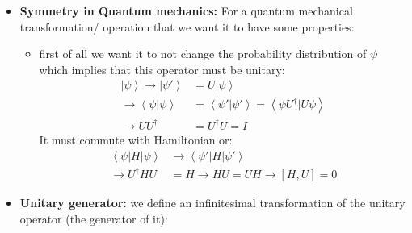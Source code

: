 \documentclass[10pt,a4paper]{article}
\newcommand{\braket}[2]{\left\langle #1 \vert #2 \right\rangle}
\newcommand{\ket}[1]{\left\vert #1 \right\rangle}
\begin{document}
\begin{itemize}
\begin{itemize}
\begin{equation}
\begin{matrix}
                              OO^T =O^TO = I
                         \end{matrix}\right.
                    \end{equation} 
                    \item $SO(n)$ is the special orthogonal group, these not only have the properties of orthogonal groups but also have the determinant of $1$.
                    \item $U(n)$ is the unitary group. 
                    \begin{equation} 
                         u\in U(n) \Rightarrow \left\{ \begin{matrix} n\times n \\
                              uu^\dagger =u^\dagger u = I
                         \end{matrix}\right.
                    \end{equation} 
               \end{itemize}
               \item \textbf{Symmetry in Quantum mechanics:} For a quantum mechanical transformation/ operation that we want it to have some properties:
               \begin{itemize}
                    \item first of all we want it to not change the probability distribution of $\psi$ which implies that this operator must be unitary:
                    \begin{align*}
                         \ket{\psi} \rightarrow \ket{\psi'} &= U\ket{\psi}\\
                         \rightarrow\braket{\psi}{\psi} &= \braket{\psi'}{\psi'} =\braket{\psi U^\dagger}{U\psi}\\
                         \rightarrow UU^\dagger &= U^\dagger U = I
                    \end{align*}
                    It must commute with Hamiltonian or:
                    \begin{align*}
                         \braket{\psi}{H\vert\psi}&\rightarrow\braket{\psi'\vert H}{\psi'}\\
                         \rightarrow U^\dagger HU &= H\rightarrow HU = UH \rightarrow [H,U]=0
                    \end{align*}
               \end{itemize} 
               \item \textbf{Unitary generator:} we define an infinitesimal transformation of the unitary operator (the generator of it):

\end{itemize}
\end{document}
